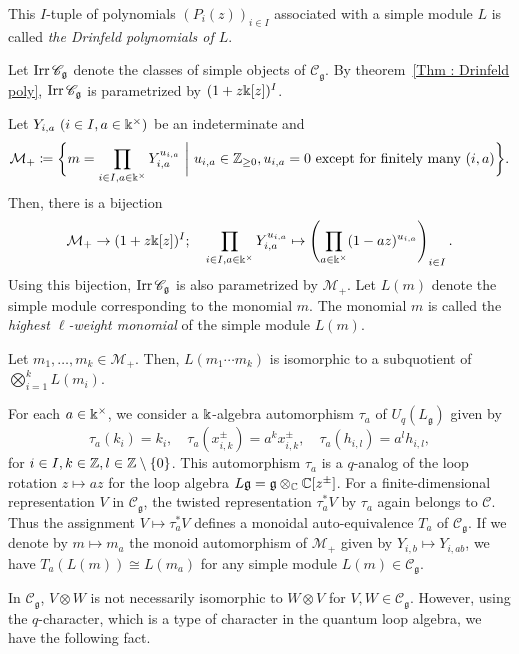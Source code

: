 This $I$-tuple of polynomials $(P_i(z))_{i \in I}$
associated with a simple module $L$
is called \emph{the Drinfeld polynomials of $L$}.


Let $\mathop{\mathrm{Irr}}\nolimits\mathscr{C}_{\mathfrak{g}}$ denote the classes of simple objects of
$\mathscr{C}_{\mathfrak{g}}$.
By theorem~\ref{Thm : Drinfeld poly}, $\mathop{\mathrm{Irr}}\nolimits\mathscr{C}_{\mathfrak{g}}$
is parametrized by $(1 + z\Bbbk[z])^I$.

Let $Y_{i, a}\ (i \in I, a \in \Bbbk^{\times})$ be an indeterminate and
\[
\mathcal{M}_{+} \coloneq
\biggl\{m = \prod_{i \in I, a \in \Bbbk^{\times}}Y_{i, a}^{u_{i, a}}
\ \bigg|\ u_{i, a} \in \mathbb{Z}_{\geq 0},
u_{i, a} = 0\ \text{except for finitely many }(i, a)\biggr\}.
\]
Then, there is a bijection
\[
\mathcal{M}_{+} \to (1 + z\Bbbk[z])^I; \quad
\prod_{i \in I, a \in \Bbbk^{\times}}Y_{i, a}^{u_{i, a}}
\mapsto \left(\prod_{a \in \Bbbk^{\times}}(1 - az)^{u_{i, a}}\right)_{i \in I}.
\]
Using this bijection, $\mathop{\mathrm{Irr}}\nolimits\mathscr{C}_{\mathfrak{g}}$ is also parametrized
by $\mathcal{M}_{+}$.
Let $L(m)$ denote the simple module corresponding to the monomial $m$.
The monomial $m$ is called the \emph{highest $\ell$-weight monomial}
of the simple module $L(m)$.

\begin{Prop}[{\cite[Corollary 3.5]{CP95}}]
\label{Prop : subquot}
Let $m_1, \ldots, m_k \in \mathcal{M}_{+}$.
Then, $L(m_1\cdots m_k)$ is isomorphic to a subquotient
of $\bigotimes_{i = 1}^{k}L(m_i)$.
\end{Prop}

For each $a \in \Bbbk^{\times}$, we consider a $\Bbbk$-algebra automorphism
$\tau_a$ of $U_q(L_{\mathfrak{g}})$ given by
\[
\tau_a(k_i) = k_i, \quad
\tau_a(x_{i, k}^{\pm}) = a^k x_{i, k}^{\pm}, \quad
\tau_a(h_{i, l}) = a^l h_{i, l},
\]
for $i \in I, k \in \mathbb{Z}, l \in \mathbb{Z} \setminus \{0\}$.
This automorphism $\tau_a$ is a $q$-analog of the loop rotation
$z \mapsto az$ for the loop algebra $L\mathfrak{g} = \mathfrak{g}
\otimes_{\mathbb{C}}\mathbb{C}[z^{\pm}]$.
For a finite-dimensional representation $V$ in $\mathscr{C}_{\mathfrak{g}}$,
the twisted representation $\tau_a^*V$ by $\tau_a$
again belongs to $\mathscr{C}$.
Thus the assignment $V \mapsto \tau_a^*V$ defines a monoidal
auto-equivalence $T_a$ of $\mathscr{C}_{\mathfrak{g}}$.
If we denote by $m \mapsto m_a$ the monoid automorphism
of $\mathcal{M}_{+}$ given by $Y_{i, b} \mapsto Y_{i, ab}$,
we have $T_a(L(m)) \cong L(m_a)$
for any simple module $L(m) \in \mathscr{C}_{\mathfrak{g}}$.

In $\mathscr{C}_{\mathfrak{g}}$,
$V \otimes W$ is not necessarily isomorphic to $W \otimes V$
for $V, W \in \mathscr{C}_{\mathfrak{g}}$.
However, using the $q$-character,
which is a type of character in the quantum loop algebra,
we have the following fact.

